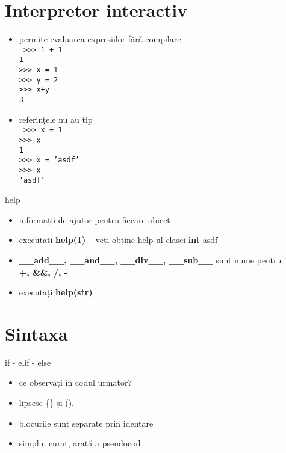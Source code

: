 \documentclass{beamer}
\begin{document}
\section{Interpretor interactiv}
\frame{\tableofcontents[currentsection]}


\begin{frame}{}
  \begin{itemize}
  \item permite evaluarea expresiilor fără compilare \\
    \texttt{
      >>> 1 + 1 \\ 
      1         \\
      >>> x = 1 \\ 
      >>> y = 2 \\ 
      >>> x+y   \\
      3
    }
  \item referințele nu au tip\\
    \texttt{
      >>> x = 1        \\
      >>> x            \\
      1                \\
      >>> x = 'asdf'   \\
      >>> x            \\
      'asdf'
    }
  \end{itemize}
\end{frame}

\begin{frame}{help}
  \begin{itemize}
  \item informații de ajutor pentru fiecare obiect
  \item executați \textbf{help(1)} – veți obține help-ul 
    clasei \textbf{int} asdf
  \item \textbf{\_\_add\_\_, \_\_and\_\_, \_\_div\_\_, \_\_sub\_\_} 
    sunt nume pentru \\
    \textbf{+, \&\&, /, -}
  \item executați \textbf{help(str)}
  \end{itemize}
\end{frame}



\section{Sintaxa}
\frame{\tableofcontents[currentsection]}

\begin{frame}{if - elif - else}
  \begin{itemize}[<+->]
  \item ce observați în codul următor? \\
    
  \item lipsesc \{\} și ().
  \item blocurile sunt separate prin identare
  \item simplu, curat, arată a pseudocod
  \end{itemize}
\end{frame}
\end{document}
